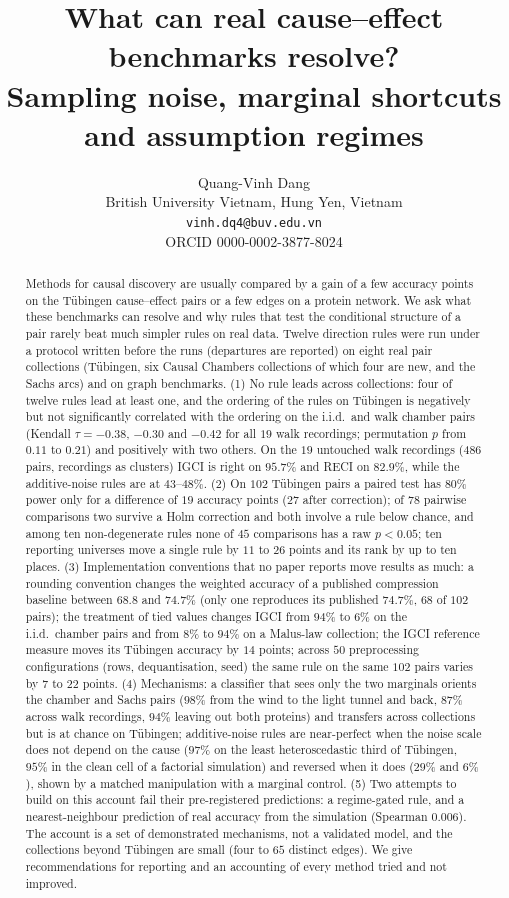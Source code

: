 \documentclass[11pt]{article}
\title{What can real cause--effect benchmarks resolve?\\ Sampling noise, marginal shortcuts and assumption regimes}
\author{Quang-Vinh Dang\\British University Vietnam, Hung Yen, Vietnam\\\texttt{vinh.dq4@buv.edu.vn}\\ORCID 0000-0002-3877-8024}
\date{}
\begin{document}
\maketitle
\begin{abstract}
Methods for causal discovery are usually compared by a gain of a few accuracy points on the T\"ubingen cause--effect pairs or a few edges on a protein network. We ask what these benchmarks can resolve and why rules that test the conditional structure of a pair rarely beat much simpler rules on real data. Twelve direction rules were run under a protocol written before the runs (departures are reported) on eight real pair collections (T\"ubingen, six Causal Chambers collections of which four are new, and the Sachs arcs) and on graph benchmarks. (1) No rule leads across collections: four of twelve rules lead at least one, and the ordering of the rules on T\"ubingen is negatively but not significantly correlated with the ordering on the i.i.d.\ and walk chamber pairs (Kendall $\tau=-0.38$, $-0.30$ and $-0.42$ for all $19$ walk recordings; permutation $p$ from $0.11$ to $0.21$) and positively with two others. On the $19$ untouched walk recordings (486 pairs, recordings as clusters) IGCI is right on $95.7\%$ and RECI on $82.9\%$, while the additive-noise rules are at $43$--$48\%$. (2) On $102$ T\"ubingen pairs a paired test has $80\%$ power only for a difference of $19$ accuracy points ($27$ after correction); of $78$ pairwise comparisons two survive a Holm correction and both involve a rule below chance, and among ten non-degenerate rules none of $45$ comparisons has a raw $p<0.05$; ten reporting universes move a single rule by $11$ to $26$ points and its rank by up to ten places. (3) Implementation conventions that no paper reports move results as much: a rounding convention changes the weighted accuracy of a published compression baseline between $68.8$ and $74.7\%$ (only one reproduces its published $74.7\%$, $68$ of $102$ pairs); the treatment of tied values changes IGCI from $94\%$ to $6\%$ on the i.i.d.\ chamber pairs and from $8\%$ to $94\%$ on a Malus-law collection; the IGCI reference measure moves its T\"ubingen accuracy by $14$ points; across $50$ preprocessing configurations (rows, dequantisation, seed) the same rule on the same $102$ pairs varies by $7$ to $22$ points. (4) Mechanisms: a classifier that sees only the two marginals orients the chamber and Sachs pairs ($98\%$ from the wind to the light tunnel and back, $87\%$ across walk recordings, $94\%$ leaving out both proteins) and transfers across collections but is at chance on T\"ubingen; additive-noise rules are near-perfect when the noise scale does not depend on the cause ($97\%$ on the least heteroscedastic third of T\"ubingen, $95\%$ in the clean cell of a factorial simulation) and reversed when it does ($29\%$ and $6\%$), shown by a matched manipulation with a marginal control. (5) Two attempts to build on this account fail their pre-registered predictions: a regime-gated rule, and a nearest-neighbour prediction of real accuracy from the simulation (Spearman $0.006$). The account is a set of demonstrated mechanisms, not a validated model, and the collections beyond T\"ubingen are small (four to $65$ distinct edges). We give recommendations for reporting and an accounting of every method tried and not improved.

\end{abstract}
\end{document}
